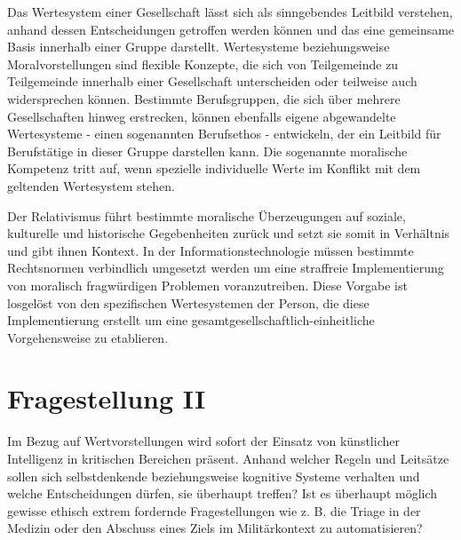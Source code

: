 \documentclass[journal]{IEEEtran}
\begin{document}
\begin{onecolumn}
Das Wertesystem einer Gesellschaft lässt sich als sinngebendes Leitbild verstehen, anhand dessen 
Entscheidungen getroffen werden können und das eine gemeinsame Basis innerhalb einer Gruppe darstellt. 
Wertesysteme beziehungsweise Moralvorstellungen sind flexible Konzepte, die sich von Teilgemeinde zu 
Teilgemeinde innerhalb einer Gesellschaft unterscheiden oder teilweise auch widersprechen können. 
Bestimmte Berufsgruppen, die sich über mehrere Gesellschaften hinweg erstrecken, können ebenfalls eigene 
abgewandelte Wertesysteme - einen sogenannten Berufsethos - entwickeln, der ein Leitbild für Berufstätige 
in dieser Gruppe darstellen kann. Die sogenannte moralische Kompetenz tritt auf, wenn spezielle
individuelle Werte im Konflikt mit dem geltenden Wertesystem stehen.

Der Relativismus führt bestimmte moralische Überzeugungen auf soziale, kulturelle und historische
Gegebenheiten zurück und setzt sie somit in Verhältnis und gibt ihnen Kontext.
In der Informationstechnologie müssen bestimmte Rechtsnormen verbindlich umgesetzt werden um eine 
straffreie Implementierung von moralisch fragwürdigen Problemen voranzutreiben. Diese Vorgabe ist
losgelöst von den spezifischen Wertesystemen der Person, die diese Implementierung erstellt um eine
gesamtgesellschaftlich-einheitliche Vorgehensweise zu etablieren.

\section*{Fragestellung II}

Im Bezug auf Wertvorstellungen wird sofort der Einsatz von künstlicher Intelligenz in kritischen 
Bereichen präsent. Anhand welcher Regeln und Leitsätze sollen sich selbstdenkende beziehungsweise 
kognitive Systeme verhalten und welche Entscheidungen dürfen, sie überhaupt treffen? Ist es überhaupt 
möglich gewisse ethisch extrem fordernde Fragestellungen wie z. B. die Triage in der Medizin oder den
Abschuss eines Ziels im Militärkontext zu automatisieren?


\end{onecolumn}
\end{document}
